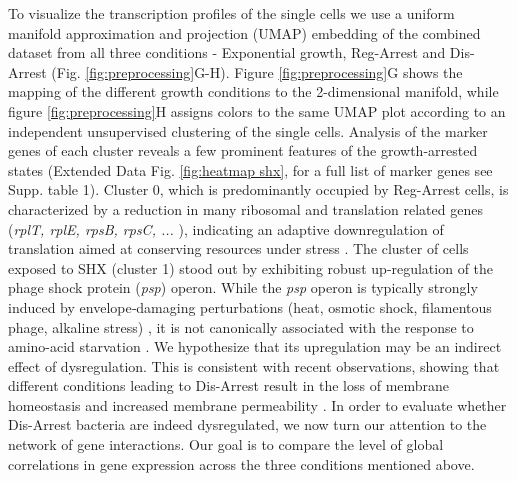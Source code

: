 \documentclass[12pt]{article}
\begin{document}
To visualize the transcription profiles of the single cells we use a uniform manifold approximation and projection (UMAP) \cite{mcinnes2020umapuniformmanifoldapproximation} embedding of the combined dataset from all three conditions - Exponential growth, Reg-Arrest and Dis-Arrest (Fig. \ref{fig:preprocessing}G-H). Figure \ref{fig:preprocessing}G shows the mapping of the different growth conditions to the 2-dimensional manifold, while figure \ref{fig:preprocessing}H assigns colors to the same UMAP plot according to an independent unsupervised clustering of the single cells. Analysis of the marker genes of each cluster reveals a few prominent features of the growth-arrested states (Extended Data Fig. \ref{fig:heatmap shx}, for a full list of marker genes see Supp. table 1). Cluster 0, which is predominantly occupied by Reg-Arrest cells, is characterized by a reduction in many ribosomal and translation related genes (\textit{rplT, rplE, rpsB, rpsC, ... }), indicating an adaptive downregulation of translation aimed at conserving resources under stress \cite{Traxler2008,Li2014}. The cluster of cells exposed to SHX (cluster 1) stood out by exhibiting robust up‑regulation of the phage shock protein (\textit{psp}) operon. While the \textit{psp} operon is typically strongly induced by envelope‐damaging perturbations (heat, osmotic shock, filamentous phage, alkaline stress) \cite{weiner1994,Model1997}, it is not canonically associated with the response to amino-acid starvation \cite{Durfee2008}. We hypothesize that its upregulation may be an indirect effect of dysregulation. This is consistent with recent observations, showing that different conditions leading to Dis-Arrest result in the loss of membrane homeostasis and increased membrane permeability \cite{Rotem2024}. In order to evaluate whether Dis-Arrest bacteria are indeed dysregulated, we now turn our attention to the network of gene interactions. Our goal is to compare the level of global correlations in gene expression across the three conditions mentioned above. \par
\end{document}
